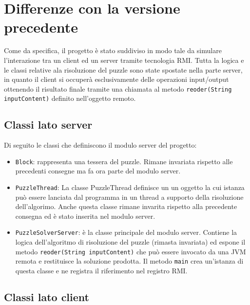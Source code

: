 %
%

\section{Differenze con la versione precedente}

Come da specifica, il progetto è stato suddiviso in modo tale da simulare l'interazione tra un client ed un server
tramite tecnologia RMI. Tutta la logica e le classi relative ala risoluzione del puzzle sono state spostate nella
parte server, in quanto il client si occuperà esclusivamente delle operazioni input/output ottenendo il risultato
finale tramite una chiamata al metodo \texttt{reoder(String inputContent)} definito nell'oggetto remoto.

\subsection{Classi lato server}

Di seguito le classi che definiscono il modulo server del progetto:

\begin{itemize}
    \item \texttt{Block}: rappresenta una tessera del puzzle. Rimane invariata rispetto alle precedenti consegne ma
    fa ora parte del modulo server.
    \item \texttt{PuzzleThread}: La classe PuzzleThread definisce un un oggetto la cui istanza può essere lanciata
    dal programma in un thread a supporto della risoluzione dell’algorimo. Anche questa classe rimane invarita
    rispetto alla precedente consegna ed è stato inserita nel modulo server.
    \item \texttt{PuzzleSolverServer}: è la classe principale del modulo server. Contiene la logica dell'algoritmo di
    risoluzione del puzzle (rimasta invariata) ed espone il metodo \texttt{reoder(String inputContent)} che può essere
    invocato da una JVM remota e restituisce la soluzione prodotta. Il metodo \texttt{main} crea un'istanza di questa
    classe e ne registra il riferimento nel registro RMI.
\end{itemize}


\subsection{Classi lato client}

